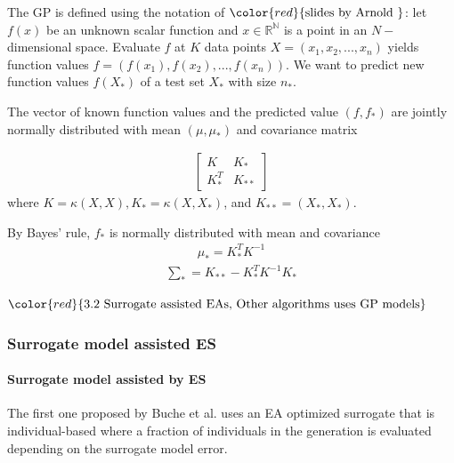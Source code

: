 The GP is defined using the notation of $\color{red}{\text{slides by Arnold }}$: let $f(x)$ be an unknown scalar function and $x \in \mathbb{R^N}$ is a point in an $N-$dimensional space. Evaluate $f$ at $K$ data points $X=(x_1,x_2,...,x_n)$ yields function values $f = (f(x_1),f(x_2),...,f(x_n))$. We want to predict new function values $f(X_*)$ of a test set $X_*$ with size $n_*$.

The vector of known function values and the predicted value $(f,f_*)$ are jointly normally distributed with mean $(\mu,\mu_*)$ and covariance matrix

\begin{align}
\begin{bmatrix}
K & K_*\\
K_*^T&K_{**}
\end{bmatrix}
\end{align}
where $K = \kappa(X,X),K_* = \kappa (X,X_*)$, and $K_{**} = (X_*,X_*)$. 

By Bayes' rule, $f_*$ is normally distributed with mean and covariance 
\begin{align}
\mu_* = K_*^T K^{-1}
\end{align}
\begin{align}
\sum_* = K_{**}- K_*^TK^{-1}K_*
\end{align}






$\color{red}{\text{3.2 Surrogate assisted EAs, Other algorithms uses GP models}}$


\subsubsection{Surrogate model assisted ES}\label{sssec:surrogate_assisted_ES}\hfill



\paragraph{Surrogate model assisted by ES}
The first one proposed by Buche et al. \cite{1424193} uses an EA optimized surrogate that is individual-based where a fraction of individuals in the generation is evaluated depending on the surrogate model error. 

